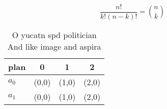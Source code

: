 \documentclass[a4paper]{article}
\begin{document}
\[ \frac{n!}{k!(n-k)!} = \binom{n}{k} \]

\begin{table}
\begin{adjustbox}{width=0.6\columnwidth}
\begin{tabular}{|l|l|l|l|}
\hline
\textbf{plan} & \multicolumn{1}{c|}{\textbf{0}} & \multicolumn{1}{c|}{\textbf{1}} & \multicolumn{1}{c|}{\textbf{2}} \\ \hline
\textbf{$a_0$}  & (0,0) & (1,0) & (2,0) \\ \hline
\textbf{$a_1$}  & (0,0) & (1,0) & (2,0) \\ \hline
\end{tabular}
\end{adjustbox}
\caption{O yucatn spd politician And like image and aspira
}
\end{table}
\end{document}
